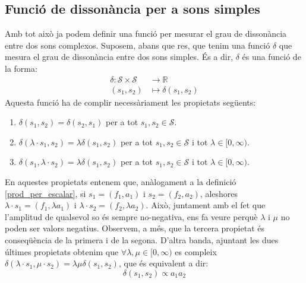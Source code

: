 \documentclass{article}
\theoremstyle{math}
\theoremstyle{TheoremNum}
\newcommand{\0}{\ensuremath{\vb{0}}}
\newcommand{\RR}{\ensuremath{\mathbb{R}}} %
\begin{document}
\subsection{Funció de dissonància per a sons simples}
Amb tot això ja podem definir una funció per mesurar el grau de dissonància entre dos sons complexos. Suposem, abans que res, que tenim una funció $\delta$ que mesura el grau de dissonància entre dos sons simples. És a dir, $\delta$ és una funció de la forma:
\begin{align*}
    \delta:\mathcal{S}\times\mathcal{S}&\longrightarrow\RR\\
    (s_1,s_2)&\longmapsto\delta(s_1,s_2)
\end{align*}
Aquesta funció ha de complir necessàriament les propietats següents:
\begin{enumerate}[label=$\delta$\arabic*),ref=$\delta$\arabic*]
    \item\label{delta1} $\delta(s_1,s_2)=\delta(s_2,s_1)$ per a tot $s_1,s_2\in\mathcal{S}$.
    \item\label{delta2} $\delta(\lambda\cdot s_1,s_2)=\lambda\delta(s_1,s_2)$ per a tot $s_1,s_2\in\mathcal{S}$ i tot $\lambda\in[0,\infty)$.
    \item\label{delta3} $\delta(s_1,\lambda\cdot s_2)=\lambda\delta(s_1,s_2)$ per a tot $s_1,s_2\in\mathcal{S}$ i tot $\lambda\in[0,\infty)$.\par
\end{enumerate}
En aquestes propietats entenem que, anàlogament a la definició \ref{prod_per_escalar}, si $s_1=(f_1,a_1)$ i $s_2=(f_2,a_2)$, aleshores $\lambda\cdot s_1=(f_1,\lambda a_1)$ i $\lambda\cdot s_2=(f_2,\lambda a_2)$. Això, juntament amb el fet que l'amplitud de qualsevol so és sempre no-negativa, ens fa veure perquè $\lambda$ i $\mu$ no poden ser valors negatius. Observem, a més, que la tercera propietat és conseqüència de la primera i de la segona. D'altra banda, ajuntant les dues últimes propietats obtenim que $\forall\lambda,\mu\in[0,\infty)$ es compleix $\delta(\lambda\cdot s_1,\mu\cdot s_2)=\lambda\mu\delta(s_1,s_2)$, que és equivalent a dir: $$\delta(s_1,s_2)\propto a_1a_2$$
\end{document}

